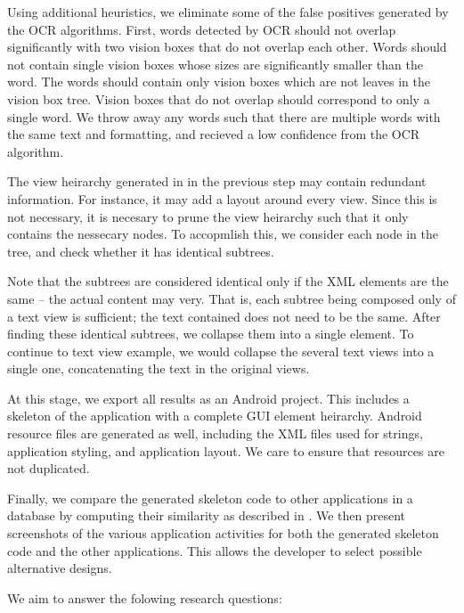 \documentclass[10pt,twocolumn]{article}
\begin{document}
Using additional heuristics, we eliminate some of the false positives generated
by the OCR algorithms.  First, words detected by OCR should not overlap
significantly with two vision boxes that do not overlap each other.  Words
should not contain single vision boxes whose sizes are significantly smaller
than the word.  The words should contain only vision boxes which are not leaves
in the vision box tree.  Vision boxes that do not overlap should correspond to
only a single word.  We throw away any words such that there are multiple words
with the same text and formatting, and recieved a low confidence from the OCR
algorithm.

The view heirarchy generated in in the previous step may contain redundant
information.  For instance, it may add a layout around every view.  Since this
is not necessary, it is necesary to prune the view heirarchy such that it only
contains the nessecary nodes.  To accopmlish this, we consider each node in the
tree, and check whether it has identical subtrees.

Note that the subtrees are considered identical only if the XML elements are the
same -- the actual content may very.  That is, each subtree being composed only
of a text view is sufficient; the text contained does not need to be the same.
After finding these identical subtrees, we collapse them into a single element.
To continue to text view example, we would collapse the several text views into
a single one, concatenating the text in the original views.

At this stage, we export all results as an Android project.  This includes a
skeleton of the application with a complete GUI element heirarchy.  Android
resource files are generated as well, including the XML files used for strings,
application styling, and application layout.  We care to ensure that resources
are not duplicated.

Finally, we compare the generated skeleton code to other applications in a
database by computing their similarity as described in \cite{clan}.  We then
present screenshots of the various application activities for both the generated
skeleton code and the other applications.  This allows the developer to select
possible alternative designs.


We aim to answer the folowing research questions:
\end{document}
